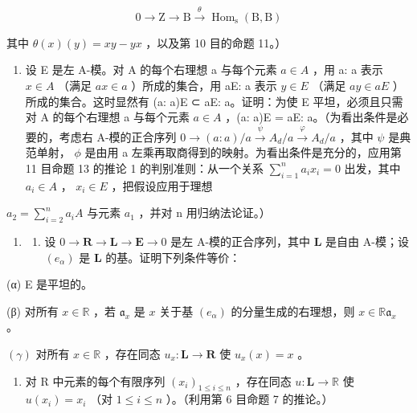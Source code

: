 \[
0 \longrightarrow \mathrm{Z} \longrightarrow \mathrm{B} \stackrel {\theta} {\longrightarrow} \operatorname{Hom} _ {\mathrm{s}} (\mathrm{B}, \mathrm{B})
\]

其中 \(\theta (x)(y) = xy - yx\) ，以及第 10 目的命题 11。）

\begin{enumerate}
\def\labelenumi{\arabic{enumi}.}
\setcounter{enumi}{21}
\tightlist
\item
  设 E 是左 A-模。对 A 的每个右理想 a 与每个元素 \(a \in A\) ，用 a: a 表示 \(x \in A\) （满足 \(ax \in a\) ）所成的集合，用 aE: a 表示 \(y \in E\) （满足 \(ay \in aE\) ）所成的集合。这时显然有 (a: a)E ⊂ aE: a。证明：为使 E 平坦，必须且只需对 A 的每个右理想 a 与每个元素 \(a \in A\) ，(a: a)E = aE: a。（为看出条件是必要的，考虑右 A-模的正合序列 \(0 \to (a: a)/a \stackrel{\psi}{\to} A_d/a \stackrel{\varphi}{\to} A_d/a\) ，其中 \(\psi\) 是典范单射， \(\phi\) 是由用 a 左乘再取商得到的映射。为看出条件是充分的，应用第 11 目命题 13 的推论 1 的判别准则：从一个关系 \(\sum_{i=1}^{n} a_i x_i = 0\) 出发，其中 \(a_i \in A\) ， \(x_i \in E\) ，把假设应用于理想
\end{enumerate}

\(a_{2}=\sum_{i=2}^{n}a_{i}A\) 与元素 \(a_{1}\) ，并对 n 用归纳法论证。）

\begin{enumerate}
\def\labelenumi{\arabic{enumi}.}
\setcounter{enumi}{22}
\tightlist
\item
  \begin{enumerate}
  \def\labelenumii{(\alph{enumii})}
  \tightlist
  \item
  设 \(0 \to \mathbf{R} \to \mathbf{L} \to \mathbf{E} \to 0\) 是左 A-模的正合序列，其中 \(\mathbf{L}\) 是自由 A-模；设 \((e_{\alpha})\) 是 \(\mathbf{L}\) 的基。证明下列条件等价：
  \end{enumerate}
\end{enumerate}

(α) E 是平坦的。

(β) 对所有 \(x \in \mathbb{R}\) ，若 \(\mathfrak{a}_x\) 是 \(x\) 关于基 \((e_{\alpha})\) 的分量生成的右理想，则 \(x \in \mathbb{R}\mathfrak{a}_x\) 。

\((\gamma)\) 对所有 \(x \in \mathbb{R}\) ，存在同态 \(u_x: \mathbf{L} \to \mathbf{R}\) 使 \(u_x(x) = x\) 。

\begin{enumerate}
\def\labelenumi{(\arabic{enumi})}
\setcounter{enumi}{7}
\tightlist
\item
对 R 中元素的每个有限序列 \((x_{i})_{1\leqslant i\leqslant n}\) ，存在同态 \(u\colon \mathbf{L}\to \mathbb{R}\) 使 \(u(x_{i}) = x_{i}\) （对 \(1\leqslant i\leqslant n\) ）。（利用第 6 目命题 7 的推论。）
\end{enumerate}


